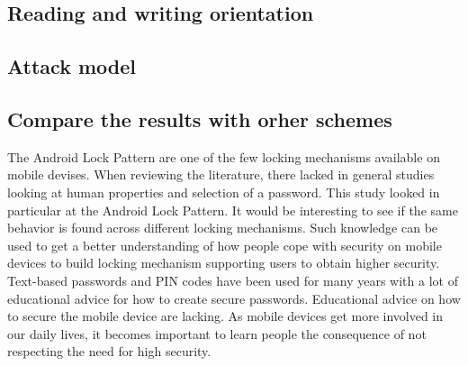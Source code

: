 

    \subsection*{Reading and writing orientation}

    \subsection*{Attack model}

    \subsection*{Compare the results with orher schemes}
    The Android Lock Pattern are one of the few locking mechanisms available on mobile devises. When reviewing the literature, there lacked in general studies looking at human properties and selection of a password. This study looked in particular at the Android Lock Pattern. It would be interesting to see if the same behavior is found across different locking mechanisms. Such knowledge can be used to get a better understanding of how people cope with security on mobile devices to build locking mechanism supporting users to obtain higher security. Text-based passwords and PIN codes have been used for many years with a lot of educational advice for how to create secure passwords. Educational advice on how to secure the mobile device are lacking. As mobile devices get more involved in our daily lives, it becomes important to learn people the consequence of not respecting the need for high security. 


    


